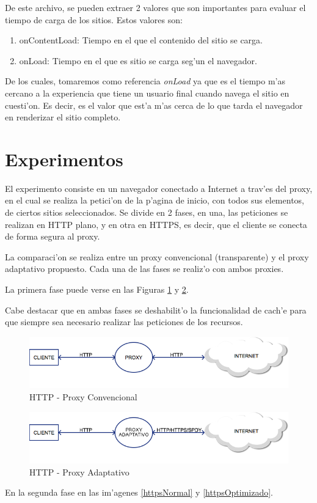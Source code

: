 De este archivo, se pueden extraer 2 valores que son importantes para evaluar el tiempo de carga de los sitios. Estos valores son:
\begin{enumerate}
\item onContentLoad: Tiempo en el que el contenido del sitio se carga.
\item onLoad: Tiempo en el que es sitio se carga seg'un el navegador.
\end{enumerate}

De los cuales, tomaremos como referencia \emph{onLoad} ya que es el tiempo m'as cercano a la experiencia que tiene un usuario final cuando navega el sitio en cuesti'on. Es decir, es el valor que est'a m'as cerca de lo que tarda el navegador en renderizar el sitio completo.
\clearpage
\section{Experimentos}

El experimento consiste en un navegador conectado a Internet a trav'es del proxy, en el cual se realiza la petici'on de la p'agina de inicio, con todos sus elementos, de ciertos sitios seleccionados. Se divide en 2 fases, en una, las peticiones se realizan en HTTP plano, y en otra en HTTPS, es decir, que el cliente se conecta de forma segura al proxy.

La comparaci'on se realiza entre un proxy convencional (transparente) y el proxy adaptativo propuesto.
Cada una de las fases se realiz'o con ambos proxies.

La primera fase puede verse en las Figuras \ref{httpNormal} y \ref{httpOptimizado}.

Cabe destacar que en ambas fases se deshabilit'o la funcionalidad de cach'e para que siempre sea necesario realizar las peticiones de los recursos.

\begin{figure}[h]
  	\centering
	\includegraphics[width=\textwidth]{img/httpNormal}
	\caption{\small HTTP - Proxy Convencional}
	\label{httpNormal}
\end{figure}

\begin{figure}[h]
  	\centering
	\includegraphics[width=\textwidth]{img/httpOptimizado}
	\caption{\small HTTP - Proxy Adaptativo}
	\label{httpOptimizado}
\end{figure}
\clearpage
En la segunda fase en las im'agenes \ref{httpsNormal} y \ref{httpsOptimizado}.

